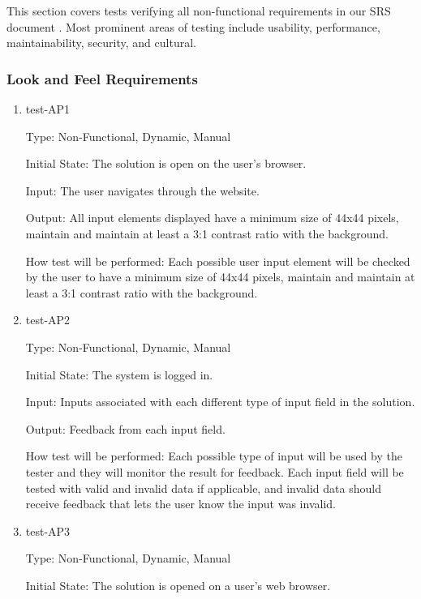 \documentclass[12pt, titlepage]{article}
\begin{document}
This section covers tests verifying all non-functional requirements in our SRS
document \cite{SRS}. Most prominent areas of testing include usability,
performance, maintainability, security, and cultural.

\subsubsection{Look and Feel Requirements}

\begin{enumerate}

  \item{test-AP1\\}

  Type: Non-Functional, Dynamic, Manual

  Initial State: The solution is open on the user's browser.

  Input: The user navigates through the website. 

  Output: All input elements displayed have a minimum size of 44x44 pixels, 
  maintain and maintain at least a 3:1 contrast ratio with the background.

  How test will be performed: Each possible user input element will be checked by 
  the user to have a minimum size of 44x44 pixels, maintain and maintain at 
  least a 3:1 contrast ratio with the background.

  \item{test-AP2\\}

  Type: Non-Functional, Dynamic, Manual

  Initial State: The system is logged in.

  Input: Inputs associated with each different type of input field in the
  solution.

  Output: Feedback from each input field.

  How test will be performed: Each possible type of input will be used by the
  tester and they will monitor the result for feedback. Each input field will
  be tested with valid and invalid data if applicable, and invalid data should
  receive feedback that lets the user know the input was invalid.

\item{test-AP3\\}

Type: Non-Functional, Dynamic, Manual

Initial State: The solution is opened on a user's web browser.


\end{enumerate}
\end{document}
